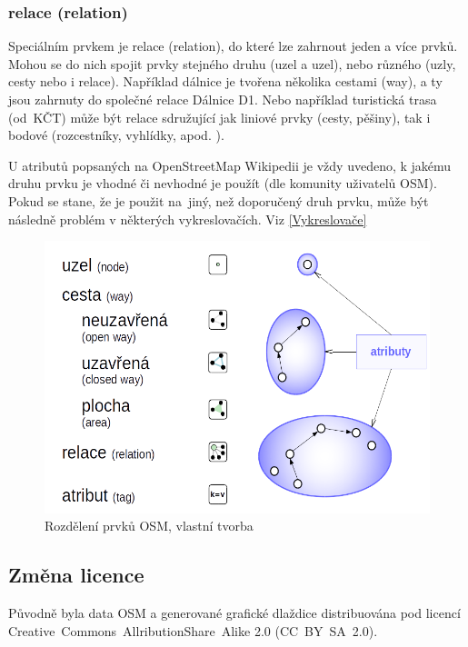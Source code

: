 \subsubsection{relace (relation) }

Speciálním prvkem je relace (relation), do které lze zahrnout
jeden a více prvků. Mohou se do nich spojit prvky stejného druhu (uzel a uzel),
nebo různého (uzly, cesty nebo i relace).
Například dálnice je tvořena několika cestami (way), a ty
jsou zahrnuty do společné relace Dálnice D1. Nebo například turistická trasa
(od~KČT) může být relace sdružující jak liniové prvky (cesty, pěšiny), tak i bodové
(rozcestníky, vyhlídky, apod. ).

U atributů popsaných na OpenStreetMap Wikipedii \cite{OSMfeatures} je vždy uvedeno,
k jakému druhu prvku je
vhodné či nevhodné je použít (dle komunity uživatelů OSM). Pokud se stane, že je použit
na~jiný, než doporučený druh prvku, může být následně problém v některých vykreslovačích. Viz \ref{Vykreslovače}
\begin{figure}[hbt]%
    \centering
    \includegraphics[scale=0.6]{./pictures/OSMelements.png}
    \caption{Rozdělení prvků OSM, vlastní tvorba}
    \label{fig:rozdělení OSM prvků}
\end{figure}


\subsection{Změna licence}
\label{změna licence}

Původně byla data OSM a generované grafické dlaždice distribuována pod licencí
Creative~Commons~AllributionShare~Alike 2.0 (CC~BY~SA~2.0).

